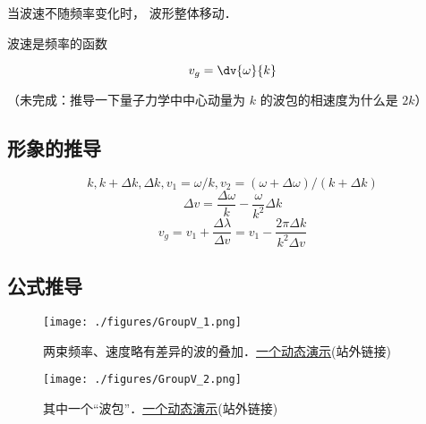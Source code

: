 
\begin{issues}
\issueDraft
\end{issues}


当波速不随频率变化时， 波形整体移动．

波速是频率的函数

\begin{equation}
v_g = \dv{\omega}{k}
\end{equation}

（未完成：推导一下量子力学中中心动量为 $k$ 的波包的相速度为什么是 $2k$）

\subsection{形象的推导}
\begin{equation}
k, k+\Delta k, \Delta k, v_1 = \omega/k, v_2 = (\omega+\Delta\omega)/(k+\Delta k)
\end{equation}
\begin{equation}
\Delta v = \frac{\Delta \omega}{k} - \frac{\omega}{k^2}\Delta k
\end{equation}
\begin{equation}
v_g = v_1 + \frac{\Delta \lambda}{\Delta v} = v_1 - \frac{2\pi\Delta k}{k^2\Delta v}
\end{equation}

\subsection{公式推导}
\begin{figure}[ht]
\centering
\texttt{[image: ./figures/GroupV\_1.png]}
\caption{两束频率、速度略有差异的波的叠加．\href{https://www.geogebra.org/m/vnjwxmqk}{一个动态演示}(站外链接)} \label{GroupV_fig1}
\end{figure}

\begin{figure}[ht]
\centering
\texttt{[image: ./figures/GroupV\_2.png]}
\caption{其中一个“波包”．\href{https://www.geogebra.org/m/xb6uqd7x}{一个动态演示}(站外链接)} \label{GroupV_fig2}
\end{figure}

